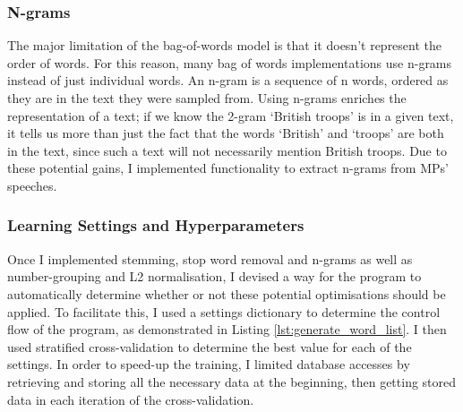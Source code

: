 \documentclass[12pt,a4paper,twoside,openright]{report}
\newcommand{\mylisting}[4]{}
\newcommand{\pylisting}[2]{\mylisting{Python}{py}{#1}{#2}}
\begin{document}
\subsubsection{N-grams}

The major limitation of the bag-of-words model is that it doesn't represent the order of words. For this reason, many bag of words implementations use n-grams instead of just individual words. An n-gram is a sequence of n words, ordered as they are in the text they were sampled from. Using n-grams enriches the representation of a text; if we know the 2-gram `British troops' is in a given text, it tells us more than just the fact that the words `British' and `troops' are both in the text, since such a text will not necessarily mention British troops. Due to these potential gains, I implemented functionality to extract n-grams from MPs' speeches.

\subsubsection{Learning Settings and Hyperparameters}

Once I implemented stemming, stop word removal and n-grams as well as number-grouping and L2 normalisation, I devised a way for the program to automatically determine whether or not these potential optimisations should be applied. To facilitate this, I used a settings dictionary to determine the control flow of the program, as demonstrated in Listing \ref{lst:generate_word_list}. I then used stratified cross-validation to determine the best value for each of the settings. In order to speed-up the training, I limited database accesses by retrieving and storing all the necessary data at the beginning, then getting stored data in each iteration of the cross-validation.
\\\\
\pylisting{A function which uses given settings to produce a word list of a given text.}{generate_word_list}
\end{document}
